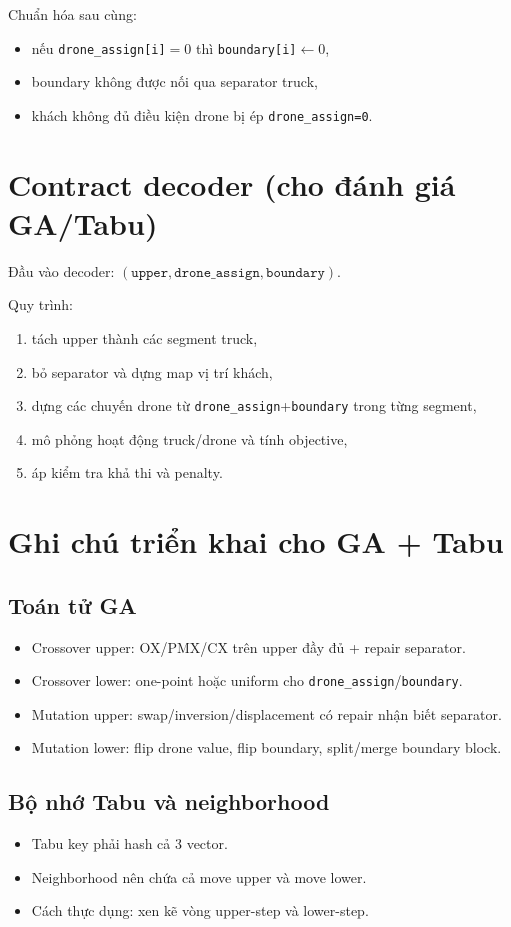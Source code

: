 \documentclass[12pt,a4paper]{article}
\begin{document}
Chuẩn hóa sau cùng:
\begin{itemize}[leftmargin=1.2cm]
    \item nếu \texttt{drone\_assign[i]}$=0$ thì \texttt{boundary[i]}$\leftarrow 0$,
    \item boundary không được nối qua separator truck,
    \item khách không đủ điều kiện drone bị ép \texttt{drone\_assign=0}.
\end{itemize}

\section{Contract decoder (cho đánh giá GA/Tabu)}
Đầu vào decoder: $(\texttt{upper},\texttt{drone\_assign},\texttt{boundary})$.

Quy trình:
\begin{enumerate}[leftmargin=1.2cm]
    \item tách upper thành các segment truck,
    \item bỏ separator và dựng map vị trí khách,
    \item dựng các chuyến drone từ \texttt{drone\_assign}+\texttt{boundary} trong từng segment,
    \item mô phỏng hoạt động truck/drone và tính objective,
    \item áp kiểm tra khả thi và penalty.
\end{enumerate}

\section{Ghi chú triển khai cho GA + Tabu}
\subsection{Toán tử GA}
\begin{itemize}[leftmargin=1.2cm]
    \item Crossover upper: OX/PMX/CX trên upper đầy đủ + repair separator.
    \item Crossover lower: one-point hoặc uniform cho \texttt{drone\_assign}/\texttt{boundary}.
    \item Mutation upper: swap/inversion/displacement có repair nhận biết separator.
    \item Mutation lower: flip drone value, flip boundary, split/merge boundary block.
\end{itemize}

\subsection{Bộ nhớ Tabu và neighborhood}
\begin{itemize}[leftmargin=1.2cm]
    \item Tabu key phải hash cả 3 vector.
    \item Neighborhood nên chứa cả move upper và move lower.
    \item Cách thực dụng: xen kẽ vòng upper-step và lower-step.
\end{itemize}
\end{document}
